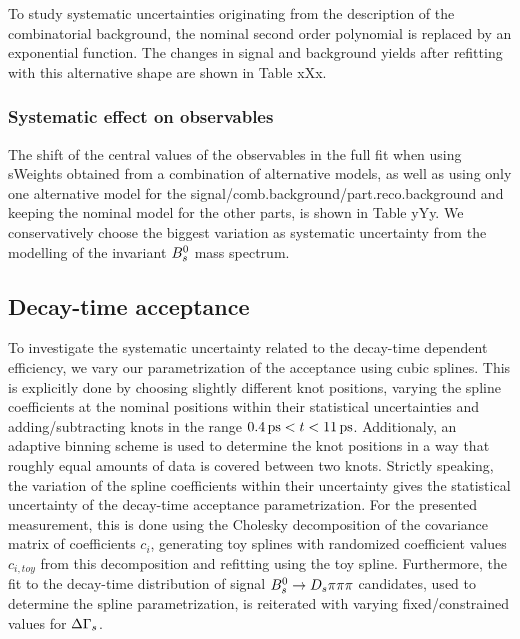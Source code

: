 To study systematic uncertainties originating from the description of the combinatorial background, the nominal second order polynomial is replaced by an exponential function. 
The changes in signal and background yields after refitting with this alternative shape are shown in Table xXx. \newline

\subsubsection{Systematic effect on observables}

The shift of the central values of the observables in the full fit when using sWeights obtained from a combination of alternative models, 
as well as using only one alternative model for the signal/comb.background/part.reco.background and keeping the nominal model for the other parts,
is shown in Table yYy. We conservatively choose the biggest variation as systematic uncertainty from the modelling of the invariant ${{B}^0_{s}}$ mass spectrum.



\subsection{Decay-time acceptance}
\label{subsec:SystTime}

To investigate the systematic uncertainty related to the decay-time dependent efficiency, we vary our parametrization of the acceptance using cubic splines.
This is explicitly done by choosing slightly different knot positions, 
varying the spline coefficients at the nominal positions within their statistical uncertainties and adding/subtracting knots in the range $0.4{\mathrm{ \,ps}} < t < 11{\mathrm{ \,ps}}$.
Additionaly, an adaptive binning scheme is used to determine the knot positions in a way that roughly equal amounts of data is covered between two knots.
Strictly speaking, the variation of the spline coefficients within their uncertainty gives the statistical uncertainty of the decay-time acceptance parametrization.
For the presented measurement, this is done using the Cholesky decomposition  \cite{Golub:1996:MC:248979} of the covariance matrix of coefficients $c_{i}$, 
generating toy splines with randomized coefficient values $c_{i,toy}$ from this decomposition and refitting using the toy spline.  
Furthermore, the fit to the decay-time distribution of signal ${{B}^0_{s}}\rightarrow{\ensuremath{{D}_{s}}}{\ensuremath{\pi}}{\ensuremath{\pi}}{\ensuremath{\pi}}$ candidates, used to determine the spline parametrization, is reiterated with varying fixed/constrained values for ${\Delta\Gamma_{{s}}}$.


